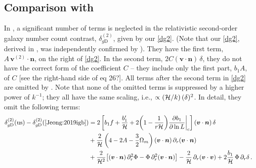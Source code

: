 \subsection*{{Comparison with \cite{Jeong:2019igb}}}

In \cite{Jeong:2019igb},  
a significant number of terms is neglected in the relativistic second-order  galaxy number count contrast, $\delta_{g\mathrm{D}}^{(2)}$, given by our \eqref{dg2}. (Note that our  \eqref{dg2}, derived in \cite{Clarkson:2018dwn}, was independently confirmed by \cite{DiDio:2018zmk}). They have the first term, $A\, \bm{v}^{(2)}\!\!\cdot\bm{n}$, on the right of \eqref{dg2}.  In the second term, $2{C}(\bm{v}\cdot\bm{n})\,\delta$, they do not have the correct form of the coefficient $C$ -- they include only the first part, $b_1A$, of $C$ [see the right-hand side of eq 26?]. All terms after the second term in \eqref{dg2} are omitted by \cite{Jeong:2019igb}. Note that none of the omitted terms is suppressed by a higher power of $k^{-1}$;  they all have the same scaling, i.e., $\propto (\mathcal{H}/k)\,{(\delta)^2}$. In detail, they omit the following
terms:
\begin{align}
\delta_{g\mathrm{D}}^{(2)}({\mathrm{us}})- \delta_{g\mathrm{D}}^{(2)}(\mbox{{\cite{Jeong:2019igb}}}) &= 2\left[b_{1}f + \frac{b_1'}{\mathcal{H}} 
+ 2\bigg(1-\frac{1}{{r} \mathcal{H}}\bigg){\frac{\partial b_1}{\partial \ln{L}}\bigg|_{\mathrm{c}}} \right](\bm{v}\cdot\bm{n})\,\delta 
\\\nonumber
& 
+ \frac{2}{\mathcal{H}}\left(4-2A-\frac{3}{2}\Omega_{m} \right)(\bm{v}\cdot\bm{n})\,\partial_r(\bm{v}\cdot\bm{n})\\
\nonumber
&
+ \frac{2}{\mathcal{H}^2}\big[(\bm{v}\cdot\bm{n}) \,\partial_r^2\Phi-\Phi\, \partial_r^2 (\bm{v}\cdot\bm{n}) \big]
 - \frac{2}{\mathcal{H}}\,\partial_r (\bm{v}\cdot\bm{v}) + 2 \frac{b_1}{\mathcal{H}}\,\Phi\, \partial_r\delta \,. 
\end{align}